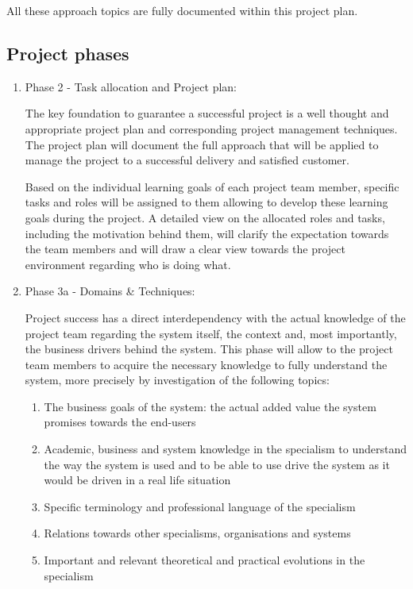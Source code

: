 All these approach topics are fully documented within this project plan.


\subsection{Project phases}

 \begin{enumerate}
	\item Phase 2 - Task allocation and Project plan: 

		The key foundation to guarantee a successful project is a well thought and appropriate project plan and corresponding project management techniques.
		The project plan will document the full approach that will be applied to manage the project to a successful delivery and satisfied customer.
		
		Based on the individual learning goals of each project team member, specific tasks and roles will be assigned to them allowing to develop these learning goals during the project.
		A detailed view on the allocated roles and tasks, including the motivation behind them, will clarify the expectation towards the team members and will draw a clear view towards the project environment regarding who is doing what.
	\item Phase 3a - Domains \& Techniques: 

		Project success has a direct interdependency with the actual knowledge of the project team regarding the system itself, the context and, most importantly, the business drivers behind the system.
		This phase will allow to the project team members to acquire the necessary knowledge to fully understand  the system, more precisely by investigation of the following topics:

 		\begin{enumerate}
			\item The business goals of the system: the actual added value the system promises towards the end-users
			\item Academic, business and system knowledge in the specialism to understand the way the system is used and to be able to use drive the system as it would be driven in a real life situation
			\item Specific terminology and professional language of the specialism
			\item Relations towards other specialisms, organisations and systems
			\item Important and relevant theoretical and practical evolutions in the specialism
		\end {enumerate}


\end{enumerate}
